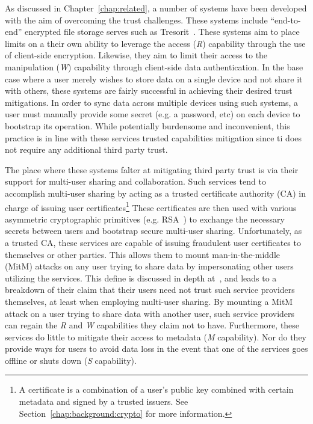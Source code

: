 As discussed in Chapter~\ref{chap:related}, a number of systems have
been developed with the aim of overcoming the trust challenges. These
systems include ``end-to-end'' encrypted file storage serves such as
Tresorit~\cite{tresorit}. These systems aim to place limits on a their
own ability to leverage the access (\emph{R}) capability through the
use of client-side encryption. Likewise, they aim to limit their
access to the manipulation (\emph{W}) capability through client-side
data authentication. In the base case where a user merely wishes to
store data on a single device and not share it with others, these
systems are fairly successful in achieving their desired trust
mitigations. In order to sync data across multiple devices using such
systems, a user must manually provide some secret (e.g. a password,
etc) on each device to bootstrap its operation. While potentially
burdensome and inconvenient, this practice is in line with these
services trusted capabilities mitigation since ti does not require any
additional third party trust.

The place where these systems falter at mitigating third party trust
is via their support for multi-user sharing and collaboration. Such
services tend to accomplish multi-user sharing by acting as a trusted
certificate authority (CA) in charge of issuing user
certificates\footnote{A certificate is a combination of a user's
  public key combined with certain metadata and signed by a trusted
  issuers. See Section~\ref{chap:background:crypto} for more
  information.} These certificates are then used with various
asymmetric cryptographic primitives (e.g. RSA~\cite{rivest1978}) to
exchange the necessary secrets between users and bootstrap secure
multi-user sharing. Unfortunately, as a trusted CA, these services are
capable of issuing fraudulent user certificates to themselves or other
parties. This allows them to mount man-in-the-middle (MitM) attacks on
any user trying to share data by impersonating other users utilizing
the services. This define is discussed in depth at~\cite{wilson2014},
and leads to a breakdown of their claim that their users need not
trust such service providers themselves, at least when employing
multi-user sharing. By mounting a MitM attack on a user trying to
share data with another user, such service providers can regain the
\emph{R} and \emph{W} capabilities they claim not to
have. Furthermore, these services do little to mitigate their access
to metadata (\emph{M} capability). Nor do they provide ways for
users to avoid data loss in the event that one of the services goes
offline or shuts down (\emph{S} capability).

